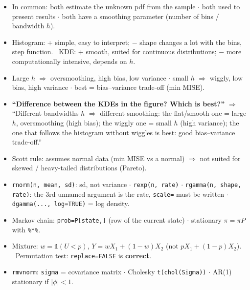 \documentclass[10pt]{article}
\newcommand{\R}[1]{\texttt{#1}}
\newcommand{\often}{\textcolor{often}{$\bullet$}}
\newcommand{\spare}{\textcolor{spare}{$\bullet$}}
\newcommand{\Q}[1]{\textbf{``#1''}}
\newcommand{\one}{\mathbb{1}}
\renewcommand{\section}[1]{\par\vspace{8pt}{\large\bfseries\color{head}#1}\par\vspace{1pt}{\color{head}\hrule}\vspace{3pt}}
\begin{document}
\section{\often{} 12. Histogram vs KDE}
\begin{itemize}
\item In common: both estimate the unknown pdf from the sample $\cdot$ both used to present results $\cdot$ both have a smoothing parameter (number of bins / bandwidth $h$).
\item Histogram: + simple, easy to interpret; $-$ shape changes a lot with the bins, step function. \ KDE: + smooth, suited for continuous distributions; $-$ more computationally intensive, depends on $h$.
\item Large $h$ $\Rightarrow$ oversmoothing, high bias, low variance $\cdot$ small $h$ $\Rightarrow$ wiggly, low bias, high variance $\cdot$ best = bias--variance trade-off (min MISE).
\item \Q{Difference between the KDEs in the figure? Which is best?} $\Rightarrow$ ``Different bandwidths $h$ $\Rightarrow$ different smoothing: the flat/smooth one = large $h$, oversmoothing (high bias); the wiggly one = small $h$ (high variance); the one that follows the histogram without wiggles is best: good bias--variance trade-off.''
\item Scott rule: assumes normal data (min MISE vs a normal) $\Rightarrow$ not suited for skewed / heavy-tailed distributions (Pareto).
\end{itemize}

\section{\spare{} 13. R}
\begin{itemize}
\item \R{rnorm(n, mean, sd)}: sd, not variance $\cdot$ \R{rexp(n, rate)} $\cdot$ \R{rgamma(n, shape, rate)}: the 3rd unnamed argument is the rate, \R{scale=} must be written $\cdot$ \R{dgamma(..., log=TRUE)} = log density.
\item Markov chain: \R{prob=P[state,]} (row of the current state) $\cdot$ stationary $\pi=\pi P$ with \R{\%*\%}.
\item Mixture: $w=\one(U<p)$, $Y=wX_1+(1-w)X_2$ (not $pX_1+(1-p)X_2$). \ Permutation test: \R{replace=FALSE} is \textbf{correct}.
\item \R{rmvnorm}: \R{sigma} = covariance matrix $\cdot$ Cholesky \R{t(chol(Sigma))} $\cdot$ AR(1) stationary if $|\phi|<1$.
\end{itemize}
\end{document}
